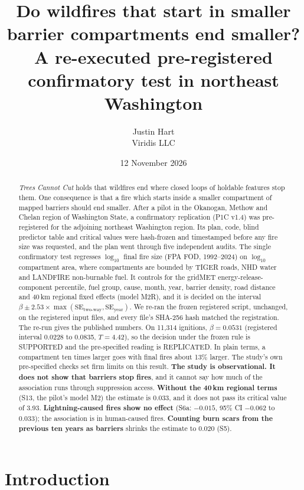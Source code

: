 \documentclass[11pt]{article}
\title{Do wildfires that start in smaller barrier compartments end smaller?\\
A re-executed pre-registered confirmatory test in northeast Washington}
\author{Justin Hart\\Viridis LLC}
\date{12 November 2026}
\begin{document}
\maketitle

\begin{abstract}
\emph{Trees Cannot Cut} holds that wildfires end where closed loops of holdable features stop them.
One consequence is that a fire which starts inside a smaller compartment of mapped barriers should end smaller.
After a pilot in the Okanogan, Methow and Chelan region of Washington State, a confirmatory replication (P1C v1.4) was
pre-registered for the adjoining northeast Washington region. Its plan, code, blind predictor table and critical
values were hash-frozen and timestamped before any fire size was requested, and the plan went through five independent audits.
The single confirmatory test regresses $\log_{10}$ final fire size (FPA FOD, 1992--2024) on $\log_{10}$ compartment
area, where compartments are bounded by TIGER roads, NHD water and LANDFIRE non-burnable fuel. It controls for the gridMET
energy-release-component percentile, fuel group, cause, month, year, barrier density, road distance and 40\,km regional fixed
effects (model M2R), and it is decided on the interval $\beta \pm 2.53\times\max(\mathrm{SE}_{\text{two-way}},\mathrm{SE}_{\text{year}})$.
We re-ran the frozen registered script, unchanged, on the registered input files, and every file's SHA-256 hash matched the registration.
The re-run gives the published numbers. On 11{,}314 ignitions, $\beta=0.0531$ (registered interval 0.0228 to 0.0835, $T=4.42$),
so the decision under the frozen rule is SUPPORTED and the pre-specified reading is REPLICATED. In plain terms, a compartment
ten times larger goes with final fires about 13\% larger.
The study's own pre-specified checks set firm limits on this result. \textbf{The study is observational. It does not show that
barriers stop fires}, and it cannot say how much of the association runs through suppression access.
\textbf{Without the 40\,km regional terms} (S13, the pilot's model M2) the estimate is 0.033, and it does not pass its critical value of 3.93.
\textbf{Lightning-caused fires show no effect} (S6a: $-0.015$, 95\% CI $-0.062$ to $0.033$); the association is in human-caused fires.
\textbf{Counting burn scars from the previous ten years as barriers} shrinks the estimate to 0.020 (S5).
\end{abstract}

\section{Introduction}
\end{document}
